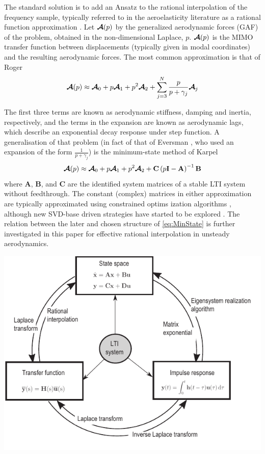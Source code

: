 \documentclass[11pt]{article}
\begin{document}
The standard solution is to add an Ansatz to the rational interpolation of the frequency sample, typically referred to in the aeroelasticity literature as a  rational function approximation \cite{Tifanny1988}. Let  $\boldsymbol{\mathcal{A}}(p)$ by the generalized aerodynamic forces (GAF) of the problem, obtained in the non-dimensional Laplace, \(p\). \(\boldsymbol{\mathcal{A}}(p)\) is the MIMO transfer function between displacements (typically given in modal coordinates) and the resulting aerodynamic forces. The most common approximation is that of Roger \cite{Roger1977}
\begin{equation}
 \boldsymbol{\mathcal{A}}(p)\approx\boldsymbol{\mathcal{A}}_0+p\boldsymbol{\mathcal{A}}_1+p^2\boldsymbol{\mathcal{A}}_2
        +\sum_{j=3}^{N}\frac{p}{p+\gamma_j}\boldsymbol{\mathcal{A}}_j
\end{equation}

The first three terms are known as aerodynamic stiffness, damping and inertia, respectively, and the terms in the expansion are known as aerodynamic lags, which describe an exponential decay response under step function. A generalisation of that problem (in fact of that of Eversman \cite{Eversman1991}, who used an expansion of the form \(\frac{1}{p+\gamma_j}\)) is the minimum-state method of Karpel \cite{Karpel1990}
\begin{equation}
\label{eq:MinState}
 \boldsymbol{\mathcal{A}}(p)\approx\boldsymbol{\mathcal{A}}_0+p\boldsymbol{\mathcal{A}}_1+p^2\boldsymbol{\mathcal{A}}_2
        +\textbf{C}\left(p\textbf{I}-\textbf{A}\right)^{-1}\textbf{B}
\end{equation}
where \(\textbf{A}\), \(\textbf{B}\), and \(\textbf{C}\) are the identified system matrices of a stable LTI system without feedthrough. The constant (complex) matrices in either approximation are typically approximated using constrained optims ization algorithms \cite{Tifanny1988}, although new SVD-base driven strategies have started to be explored \cite{Quero2019,Boncoraglio2021,Dawson2022}. The relation between the later and chosen structure of \eqref{eq:MinState} is further investigated in this paper for effective rational interpolation in unsteady aerodynamics.



\begin{center}
\includegraphics[width=.9\linewidth]{./img/rosetta_lti.pdf}
\end{center}
\end{document}
